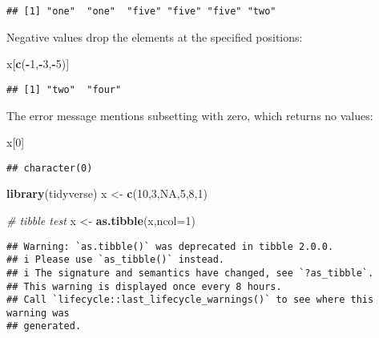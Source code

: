\documentclass[
]{article}
\newenvironment{Shaded}{\begin{snugshade}}{\end{snugshade}}
\newcommand{\AttributeTok}[1]{\textcolor[rgb]{0.13,0.29,0.53}{#1}}
\newcommand{\CommentTok}[1]{\textcolor[rgb]{0.56,0.35,0.01}{\textit{#1}}}
\newcommand{\ConstantTok}[1]{\textcolor[rgb]{0.56,0.35,0.01}{#1}}
\newcommand{\DecValTok}[1]{\textcolor[rgb]{0.00,0.00,0.81}{#1}}
\newcommand{\FunctionTok}[1]{\textcolor[rgb]{0.13,0.29,0.53}{\textbf{#1}}}
\newcommand{\NormalTok}[1]{#1}
\newcommand{\OtherTok}[1]{\textcolor[rgb]{0.56,0.35,0.01}{#1}}
\newcommand{\SpecialCharTok}[1]{\textcolor[rgb]{0.81,0.36,0.00}{\textbf{#1}}}
\begin{document}
\begin{verbatim}
## [1] "one"  "one"  "five" "five" "five" "two"
\end{verbatim}

Negative values drop the elements at the specified positions:

\begin{Shaded}
\begin{Highlighting}[]
\NormalTok{x[}\FunctionTok{c}\NormalTok{(}\SpecialCharTok{{-}}\DecValTok{1}\NormalTok{,}\SpecialCharTok{{-}}\DecValTok{3}\NormalTok{,}\SpecialCharTok{{-}}\DecValTok{5}\NormalTok{)]}
\end{Highlighting}
\end{Shaded}

\begin{verbatim}
## [1] "two"  "four"
\end{verbatim}

The error message mentions subsetting with zero, which returns no
values:

\begin{Shaded}
\begin{Highlighting}[]
\NormalTok{x[}\DecValTok{0}\NormalTok{]}
\end{Highlighting}
\end{Shaded}

\begin{verbatim}
## character(0)
\end{verbatim}

\begin{Shaded}
\begin{Highlighting}[]
\FunctionTok{library}\NormalTok{(tidyverse)}
\NormalTok{x }\OtherTok{\textless{}{-}} \FunctionTok{c}\NormalTok{(}\DecValTok{10}\NormalTok{,}\DecValTok{3}\NormalTok{,}\ConstantTok{NA}\NormalTok{,}\DecValTok{5}\NormalTok{,}\DecValTok{8}\NormalTok{,}\DecValTok{1}\NormalTok{)}

\CommentTok{\# tibble test}
\NormalTok{x }\OtherTok{\textless{}{-}} \FunctionTok{as.tibble}\NormalTok{(x,}\AttributeTok{ncol=}\DecValTok{1}\NormalTok{)}
\end{Highlighting}
\end{Shaded}

\begin{verbatim}
## Warning: `as.tibble()` was deprecated in tibble 2.0.0.
## i Please use `as_tibble()` instead.
## i The signature and semantics have changed, see `?as_tibble`.
## This warning is displayed once every 8 hours.
## Call `lifecycle::last_lifecycle_warnings()` to see where this warning was
## generated.
\end{verbatim}
\end{document}
